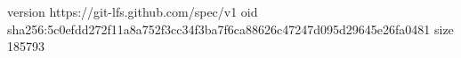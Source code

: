 version https://git-lfs.github.com/spec/v1
oid sha256:5c0efdd272f11a8a752f3cc34f3ba7f6ca88626c47247d095d29645e26fa0481
size 185793
